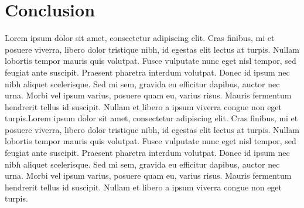 \documentclass{article}
\begin{document}
\section{Conclusion}
Lorem ipsum dolor sit amet, consectetur adipiscing elit. Cras finibus, mi et posuere viverra, libero dolor tristique nibh, id egestas elit lectus at turpis. Nullam lobortis tempor mauris quis volutpat. Fusce vulputate nunc eget nisl tempor, sed feugiat ante suscipit. Praesent pharetra interdum volutpat. Donec id ipsum nec nibh aliquet scelerisque. Sed mi sem, gravida eu efficitur dapibus, auctor nec urna. Morbi vel ipsum varius, posuere quam eu, varius risus. Mauris fermentum hendrerit tellus id suscipit. Nullam et libero a ipsum viverra congue non eget turpis.Lorem ipsum dolor sit amet, consectetur adipiscing elit. Cras finibus, mi et posuere viverra, libero dolor tristique nibh, id egestas elit lectus at turpis. Nullam lobortis tempor mauris quis volutpat. Fusce vulputate nunc eget nisl tempor, sed feugiat ante suscipit. Praesent pharetra interdum volutpat. Donec id ipsum nec nibh aliquet scelerisque. Sed mi sem, gravida eu efficitur dapibus, auctor nec urna. Morbi vel ipsum varius, posuere quam eu, varius risus. Mauris fermentum hendrerit tellus id suscipit. Nullam et libero a ipsum viverra congue non eget turpis.
\end{document}
